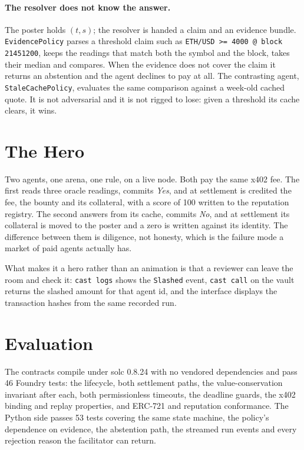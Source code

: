 \documentclass[10pt,twocolumn]{article}
\begin{document}
\paragraph{The resolver does not know the answer.} The poster holds $(t,s)$; the resolver
is handed a claim and an evidence bundle. \texttt{EvidencePolicy} parses a threshold claim
such as \texttt{ETH/USD >= 4000 @ block 21451200}, keeps the readings that match both the
symbol and the block, takes their median and compares. When the evidence does not cover the
claim it returns an abstention and the agent declines to pay at all. The contrasting agent,
\texttt{StaleCachePolicy}, evaluates the same comparison against a week-old cached quote.
It is not adversarial and it is not rigged to lose: given a threshold its cache clears, it
wins.

\section{The Hero}
Two agents, one arena, one rule, on a live node. Both pay the same x402 fee. The first
reads three oracle readings, commits \emph{Yes}, and at settlement is credited the fee, the
bounty and its collateral, with a score of 100 written to the reputation registry. The
second answers from its cache, commits \emph{No}, and at settlement its collateral is moved
to the poster and a zero is written against its identity. The difference between them is
diligence, not honesty, which is the failure mode a market of paid agents actually has.

What makes it a hero rather than an animation is that a reviewer can leave the room and
check it: \texttt{cast logs} shows the \texttt{Slashed} event, \texttt{cast call} on the
vault returns the slashed amount for that agent id, and the interface displays the
transaction hashes from the same recorded run.

\section{Evaluation}
The contracts compile under solc 0.8.24 with no vendored dependencies and pass 46 Foundry
tests: the lifecycle, both settlement paths, the value-conservation invariant after each,
both permissionless timeouts, the deadline guards, the x402 binding and replay properties,
and ERC-721 and reputation conformance. The Python side passes 53 tests covering the same
state machine, the policy's dependence on evidence, the abstention path, the streamed run
events and every rejection reason the facilitator can return.
\end{document}
